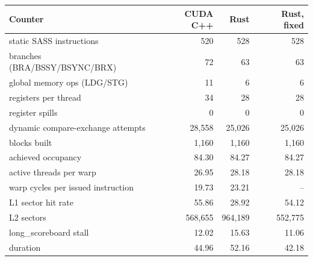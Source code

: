 \begin{tabular}{lrrr}
\toprule
Counter & CUDA C++ & Rust & Rust, fixed \\
\midrule
static SASS instructions & 520 & 528 & 528 \\
branches (BRA/BSSY/BSYNC/BRX) & 72 & 63 & 63 \\
global memory ops (LDG/STG) & 11 & 6 & 6 \\
registers per thread & 34 & 28 & 28 \\
register spills & 0 & 0 & 0 \\
dynamic compare-exchange attempts & 28,558 & 25,026 & 25,026 \\
blocks built & 1,160 & 1,160 & 1,160 \\
achieved occupancy & 84.30 & 84.27 & 84.27 \\
active threads per warp & 26.95 & 28.18 & 28.18 \\
\addlinespace
warp cycles per issued instruction & 19.73 & 23.21 & -- \\
L1 sector hit rate & 55.86 & 28.92 & 54.12 \\
L2 sectors & 568,655 & 964,189 & 552,775 \\
long\_scoreboard stall & 12.02 & 15.63 & 11.06 \\
duration & 44.96 & 52.16 & 42.18 \\
\bottomrule
\end{tabular}
